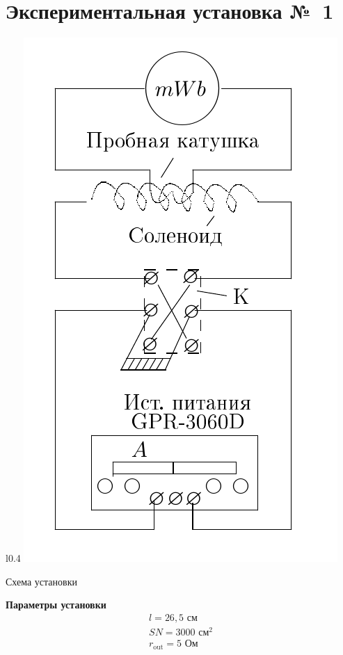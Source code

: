\documentclass[a4paper, 12pt]{article}
\begin{document}


\section*{Экспериментальная установка №~1}
\begin {wrapfigure}[23]{l}{0.4\textwidth}
\includegraphics[trim=0 0 0 20,clip,width=\linewidth]{eq1}
\caption{Схема установки}
\end {wrapfigure}
\textbf{Параметры установки}
\begin{gather*}
l=26,5 \text{ см}\\
SN=3000 \text{ см}^2\\
r_\text{out}=5 \text { Ом}
\end{gather*}
\end{document}
